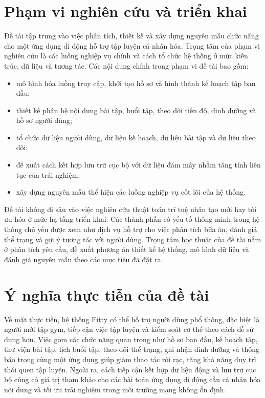 \section{Phạm vi nghiên cứu và triển khai}

Đề tài tập trung vào việc phân tích, thiết kế và xây dựng nguyên mẫu chức năng cho một ứng dụng di động hỗ trợ tập luyện cá nhân hóa. Trọng tâm của phạm vi nghiên cứu là các luồng nghiệp vụ chính và cách tổ chức hệ thống ở mức kiến trúc, dữ liệu và tương tác. Các nội dung chính trong phạm vi đề tài bao gồm:

\begin{itemize}
    \item mô hình hóa luồng truy cập, khởi tạo hồ sơ và hình thành kế hoạch tập ban đầu;
    \item thiết kế phân hệ nội dung bài tập, buổi tập, theo dõi tiến độ, dinh dưỡng và hồ sơ người dùng;
    \item tổ chức dữ liệu người dùng, dữ liệu kế hoạch, dữ liệu bài tập và dữ liệu theo dõi;
    \item đề xuất cách kết hợp lưu trữ cục bộ với dữ liệu đám mây nhằm tăng tính liên tục của trải nghiệm;
    \item xây dựng nguyên mẫu thể hiện các luồng nghiệp vụ cốt lõi của hệ thống.
\end{itemize}

Đề tài không đi sâu vào việc nghiên cứu thuật toán trí tuệ nhân tạo mới hay tối ưu hóa ở mức hạ tầng triển khai. Các thành phần có yếu tố thông minh trong hệ thống chủ yếu được xem như dịch vụ hỗ trợ cho việc phân tích bữa ăn, đánh giá thể trạng và gợi ý tương tác với người dùng. Trọng tâm học thuật của đề tài nằm ở phân tích yêu cầu, đề xuất phương án thiết kế hệ thống, mô hình dữ liệu và đánh giá nguyên mẫu theo các mục tiêu đã đặt ra.

\section{Ý nghĩa thực tiễn của đề tài}

Về mặt thực tiễn, hệ thống Fitty có thể hỗ trợ người dùng phổ thông, đặc biệt là người mới tập gym, tiếp cận việc tập luyện và kiểm soát cơ thể theo cách dễ sử dụng hơn. Việc gom các chức năng quan trọng như hồ sơ ban đầu, kế hoạch tập, thư viện bài tập, lịch buổi tập, theo dõi thể trạng, ghi nhận dinh dưỡng và thông báo trong cùng một ứng dụng giúp giảm thao tác rời rạc, tăng khả năng duy trì thói quen tập luyện. Ngoài ra, cách tiếp cận kết hợp dữ liệu động và lưu trữ cục bộ cũng có giá trị tham khảo cho các bài toán ứng dụng di động cần cá nhân hóa nội dung và tối ưu trải nghiệm trong môi trường mạng không ổn định.

